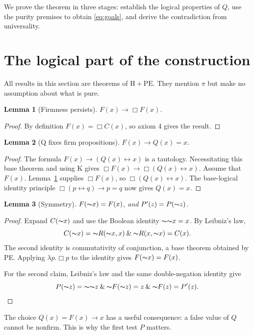 \documentclass[12pt,leqno]{article}
\newcommand{\AND}{\ensuremath{\mathbin{\&}}}
\newcommand{\IFF}{\ensuremath{\leftrightarrow}}
\newcommand{\IC}{\ensuremath{\rightarrow}}
\newcommand{\NOT}{\ensuremath{\text{$\thicksim$}}}
\newcommand{\HPE}{\ensuremath{\mathrm{H}+\mathrm{PE}}}
\theoremstyle{plain}
\newtheorem{lemma}{Lemma}
\begin{document}
We prove the theorem in three stages: establish the logical properties of
\(Q\), use the purity premises to obtain \eqref{eq:goals}, and derive the
contradiction from universality.

\section{The logical part of the construction}

All results in this section are theorems of \HPE. They mention \(\pi\)
but make no assumption about what is pure.

\begin{lemma}[Firmness persists]\label{lem:A}
\(F(x)\IC\Box F(x)\).
\end{lemma}
\begin{proof}
By definition \(F(x)=\Box C(x)\), so axiom 4 gives the result.
\end{proof}

\begin{lemma}[Q fixes firm propositions]\label{lem:B}
\(F(x)\IC Q(x)=x\).
\end{lemma}
\begin{proof}
The formula \(F(x)\IC(Q(x)\IFF x)\) is a tautology.
Necessitating this base theorem and using K gives
\(\Box F(x)\IC\Box(Q(x)\IFF x)\).
Assume that \(F(x)\). Lemma~\ref{lem:A} supplies \(\Box F(x)\),
so \(\Box(Q(x)\IFF x)\). The base-logical identity principle
\(\Box(p\IFF q)\IC p=q\) now gives \(Q(x)=x\).
\end{proof}

\begin{lemma}[Symmetry]\label{lem:C}
\(F(\NOT x)=F(x)\), and \(P'(z)=P(\NOT z)\).
\end{lemma}
\begin{proof}
Expand \(C(\NOT x)\) and use the Boolean identity \(\NOT\NOT x=x\).
By Leibniz's law,
\[
 C(\NOT x)
   =\NOT R(\NOT x,x)\AND\NOT R(x,\NOT x)
   =C(x).
\]
The second identity is commutativity of conjunction, a base theorem
obtained by PE. Applying \(\lambda p.\Box p\) to the identity gives
\(F(\NOT x)=F(x)\).

For the second claim, Leibniz's law and the same double-negation identity
give
\[
 P(\NOT z)
   =\NOT\NOT z\AND\NOT F(\NOT z)
   =z\AND\NOT F(z)
   =P'(z).
\]
\end{proof}

The choice \(Q(x)=F(x)\IC x\) has a useful consequence: a false value
of \(Q\) cannot be nonfirm. This is why the first test \(P\) matters.
\end{document}
